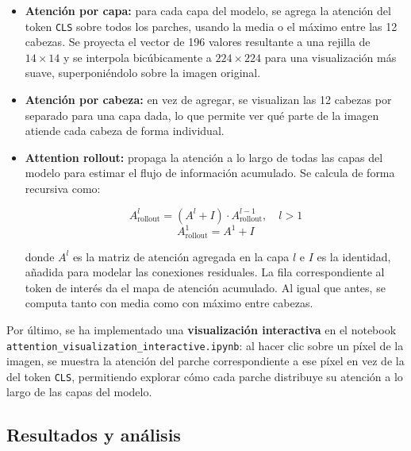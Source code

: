 \documentclass[11pt,spanish,listoffigures,listoftables]{tfgetsinf}
\begin{document}
\begin{itemize}
  \item \textbf{Atención por capa:} para cada capa del modelo, se agrega la atención del token \texttt{CLS} sobre todos los parches, usando la media o el máximo entre las 12 cabezas. Se proyecta el vector de 196 valores resultante a una rejilla de $14 \times 14$ y se interpola bicúbicamente a $224 \times 224$ para una visualización más suave, superponiéndolo sobre la imagen original.

  \item \textbf{Atención por cabeza:} en vez de agregar, se visualizan las 12 cabezas por separado para una capa dada, lo que permite ver qué parte de la imagen atiende cada cabeza de forma individual.

  \item \textbf{Attention rollout:} propaga la atención a lo largo de todas las capas del modelo para estimar el flujo de información acumulado. Se calcula de forma recursiva como:

  \begin{equation}
    A_{\text{rollout}}^{l} = \left(A^{l} + I\right) \cdot A_{\text{rollout}}^{l-1}, \quad l > 1
  \end{equation}
  \begin{equation}
    A_{\text{rollout}}^{1} = A^{1} + I
  \end{equation}

  donde $A^{l}$ es la matriz de atención agregada en la capa $l$ e $I$ es la identidad, añadida para modelar las conexiones residuales. La fila correspondiente al token de interés da el mapa de atención acumulado. Al igual que antes, se computa tanto con media como con máximo entre cabezas.
\end{itemize}

Por último, se ha implementado una \textbf{visualización interactiva} en el notebook \\ \texttt{attention\_visualization\_interactive.ipynb}: al hacer clic sobre un píxel de la imagen, se muestra la atención del parche correspondiente a ese píxel en vez de la del token \texttt{CLS}, permitiendo explorar cómo cada parche distribuye su atención a lo largo de las capas del modelo.

\clearpage

\subsection{Resultados y análisis}
\end{document}
